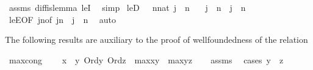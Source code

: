 \begin{isabellebody}
\ assms\ diff{\isacharunderscore}{\kern0pt}is{\isacharunderscore}{\kern0pt}{}{\isacharunderscore}{\kern0pt}lemma\ leI\ \isamarkupfalse%
\ simp%
\endisatagproof
{\isafoldproof}%
%
\isadelimproof
\isanewline
%
\endisadelimproof
\isanewline
{}\isamarkupfalse%
\ leD\ {\isacharcolon}{\kern0pt}\ \ {\isachardoublequoteopen}n{\isasymin}nat{\isachardoublequoteclose}\ {\isachardoublequoteopen}j\ {\isasymle}\ n{\isachardoublequoteclose}\isanewline
\ \ \ {\isachardoublequoteopen}j\ {\isacharless}{\kern0pt}\ n\ {\isacharbar}{\kern0pt}\ j\ {\isacharequal}{\kern0pt}\ n{\isachardoublequoteclose}\isanewline
%
\isadelimproof
\ \ %
\endisadelimproof
%
\isatagproof
{}\isamarkupfalse%
\ leE{\isacharbrackleft}{\kern0pt}OF\ {\isacartoucheopen}j{\isasymle}n{\isacartoucheclose}{\isacharcomma}{\kern0pt}of\ {\isachardoublequoteopen}j{\isacharless}{\kern0pt}n\ {\isacharbar}{\kern0pt}\ j\ {\isacharequal}{\kern0pt}\ n{\isachardoublequoteclose}{\isacharbrackright}{\kern0pt}\ \isamarkupfalse%
\ auto%
\endisatagproof
{\isafoldproof}%
%
\isadelimproof
%
\endisadelimproof
%
\isadelimdocument
%
\endisadelimdocument
%
\isatagdocument
%
\isamarkuptrue%
%
\endisatagdocument
{\isafolddocument}%
%
\isadelimdocument
%
\endisadelimdocument
%
\begin{isamarkuptext}%
The following results are auxiliary to the proof of 
wellfoundedness of the relation %
\end{isamarkuptext}\isamarkuptrue%
\isamarkupfalse%
\ max{\isacharunderscore}{\kern0pt}cong\ {\isacharcolon}{\kern0pt}\isanewline
\ \ \ {\isachardoublequoteopen}x\ {\isasymle}\ y{\isachardoublequoteclose}\ {\isachardoublequoteopen}Ord{\isacharparenleft}{\kern0pt}y{\isacharparenright}{\kern0pt}{\isachardoublequoteclose}\ {\isachardoublequoteopen}Ord{\isacharparenleft}{\kern0pt}z{\isacharparenright}{\kern0pt}{\isachardoublequoteclose}\ \ {\isachardoublequoteopen}max{\isacharparenleft}{\kern0pt}x{\isacharcomma}{\kern0pt}y{\isacharparenright}{\kern0pt}\ {\isasymle}\ max{\isacharparenleft}{\kern0pt}y{\isacharcomma}{\kern0pt}z{\isacharparenright}{\kern0pt}{\isachardoublequoteclose}\isanewline
%
\isadelimproof
\ \ %
\endisadelimproof
%
\isatagproof
{}\isamarkupfalse%
\ assms\ \isanewline
{}\isamarkupfalse%
\ {\isacharparenleft}{\kern0pt}cases\ {\isachardoublequoteopen}y\ {\isasymle}\ z{\isachardoublequoteclose}{\isacharparenright}{\kern0pt}\isanewline

\end{isabellebody}
